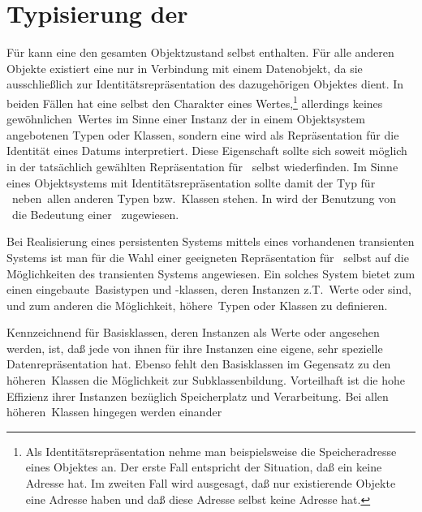 \section{Typisierung der \protect\objid}
%
F\"{u}r \immval[s]\/ kann eine \objid\/ den gesamten Objektzustand selbst
enthalten.  F\"{u}r alle anderen Objekte existiert eine \objid\/ nur in
Verbindung mit einem Datenobjekt, da sie ausschlie\ss{}lich zur
Identit\"{a}tsrepr\"{a}sentation des dazugeh\"{o}rigen Objektes dient. In
beiden F\"{a}llen hat eine \objid\/ selbst den Charakter eines
Wertes,\footnote{Als Identit\"{a}tsrepr\"{a}sentation nehme man
beispielsweise die Speicheradresse eines Objektes an. Der erste Fall
entspricht der Situation, da\ss{} ein \immval\/ keine Adresse hat. Im
zweiten Fall wird ausgesagt, da\ss{} nur existierende Objekte eine
Adresse haben und da\ss{} diese Adresse selbst keine Adresse hat.}
allerdings keines \rglq{}gew\"{o}hnlichen\rgrq\ Wertes im Sinne einer
Instanz der in einem Objektsystem angebotenen Typen oder Klassen,
sondern eine \objid\/ wird als Repr\"{a}sentation f\"{u}r die Identit\"{a}t
eines Datums interpretiert. Diese Eigenschaft sollte sich soweit
m\"{o}glich in der tats\"{a}chlich gew\"{a}hlten Repr\"{a}sentation f\"{u}r
\objid[s]\ selbst wiederfinden. Im Sinne eines Objektsystems mit
Identit\"{a}tsrepr\"{a}sentation sollte damit
der Typ f\"{u}r \objid[s]\ \rglq{}neben\rgrq\ allen anderen Typen
bzw.\ Klassen stehen. In \cite[]{bib:be87} wird
der Benutzung von \objid[s]\ die Bedeutung einer
\ zugewiesen.
%
\par{}Bei Realisierung eines persistenten Systems mittels eines
vorhandenen transienten Systems ist man f\"{u}r die Wahl einer
geeigneten Repr\"{a}sentation f\"{u}r \objid[s]\ selbst auf die
M\"{o}glichkeiten des transienten Systems angewiesen. Ein solches System
bietet zum einen \rglq{}eingebaute\rgrq\ Basistypen und -klassen, deren
Instanzen z.T.\ Werte oder \immval[s]\/ sind, und
zum anderen die M\"{o}g\-lich\-keit, \rglq{}h\"{o}here\rgrq\ Typen oder
Klassen zu definieren.
%
\par{}Kennzeichnend f\"{u}r Basisklassen, deren Instanzen als Werte oder
\immval[s]\/ angesehen werden, ist, da\ss{} jede von ihnen f\"{u}r ihre
Instanzen eine eigene, sehr spezielle Datenrepr\"{a}sentation hat. Ebenso
fehlt den Basisklassen im Gegensatz zu den \rglq{}h\"{o}heren\rgrq\ Klassen
die M\"{o}glichkeit zur Subklassenbildung. Vorteilhaft ist die hohe
Effizienz ihrer Instanzen bez\"{u}glich Speicherplatz und Verarbeitung.
Bei allen \rglq{}h\"{o}heren\rgrq\ Klassen hingegen werden einander
